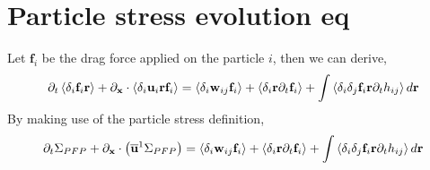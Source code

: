 \section*{Particle stress evolution eq}
Let $\textbf{f}_i$ be the drag force applied on the particle $i$, then we can derive,
\begin{equation*}
    \partial_t \left<\delta_i \textbf{f}_i\textbf{r}\right> 
  + \partial_\textbf{x} \cdot \left<\delta_i\textbf{u}_i \textbf{r} \textbf{f}_i\right>
  = \left<\delta_i\textbf{w}_{ij} \textbf{f}_i\right>
  + \left<\delta_i\textbf{r}\partial_t  \textbf{f}_i\right> 
  + \int\left<\delta_i\delta_{j} \textbf{f}_i\textbf{r}\partial_t h_{ij} \right>d\textbf{r}
\end{equation*}
By making use of the particle stress definition, 
\begin{equation*}
    \partial_t \Sigma_{PFP}
  + \partial_\textbf{x} \cdot \left(
    \overline{\textbf{u}}^{1} \Sigma_{PFP}
  \right)
  = \left<\delta_i\textbf{w}_{ij} \textbf{f}_i\right>
  + \left<\delta_i\textbf{r}\partial_t  \textbf{f}_i\right> 
  + \int \left<\delta_i\delta_{j} \textbf{f}_i\textbf{r}\partial_t h_{ij}\right>d\textbf{r}
\end{equation*}